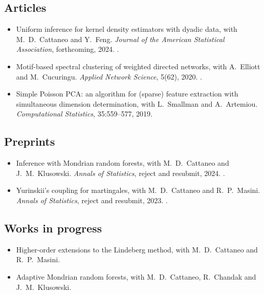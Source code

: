 \documentclass{wgu-cv}
\begin{document}
\subsection{Articles}{}
\begin{itemize}

  \item Uniform inference for kernel density estimators with dyadic data,
    with M.\ D.\ Cattaneo and Y.\ Feng.
    \emph{Journal of the American Statistical Association}, forthcoming, 2024.
    .

  \item Motif-based spectral clustering of weighted directed networks,
    with A.\ Elliott and M.\ Cucuringu.
    \emph{Applied Network Science}, 5(62), 2020.
    .

  \item Simple Poisson PCA: an algorithm for (sparse) feature extraction
    with simultaneous dimension determination,
    with L.\ Smallman and A.\ Artemiou.
    \emph{Computational Statistics}, 35:559--577, 2019.

\end{itemize}

\subsection{Preprints}{}
\begin{itemize}

  \item Inference with Mondrian random forests,
    with M.\ D.\ Cattaneo and J.\ M.\ Klusowski.
    \emph{Annals of Statistics}, reject and resubmit, 2024.
    .

  \item Yurinskii's coupling for martingales,
    with M.\ D.\ Cattaneo and R.\ P.\ Masini.
    \emph{Annals of Statistics}, reject and resubmit, 2023.
    .

\end{itemize}

\pagebreak

\subsection{Works in progress}{}
\begin{itemize}

  \item Higher-order extensions to the Lindeberg method,
    with M.\ D.\ Cattaneo and R.\ P.\ Masini.

  \item Adaptive Mondrian random forests,
    with M.\ D.\ Cattaneo, R.\ Chandak and J.\ M.\ Klusowski.
\end{itemize}
\end{document}
